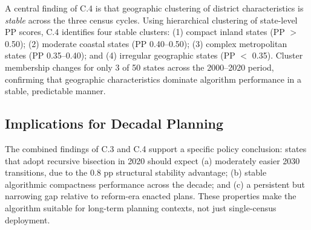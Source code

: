 A central finding of C.4 is that geographic clustering of district
characteristics is \emph{stable} across the three census cycles. Using
hierarchical clustering of state-level PP scores, C.4 identifies four
stable clusters: (1) compact inland states (PP $>$ 0.50); (2) moderate
coastal states (PP 0.40--0.50); (3) complex metropolitan states
(PP 0.35--0.40); and (4) irregular geographic states (PP $<$ 0.35).
Cluster membership changes for only 3 of 50 states across the
2000--2020 period, confirming that geographic characteristics dominate
algorithm performance in a stable, predictable manner.

\subsection{Implications for Decadal Planning}

The combined findings of C.3 and C.4 support a specific policy
conclusion: states that adopt recursive bisection in 2020 should expect
(a) moderately easier 2030 transitions, due to the $0.8$ pp structural
stability advantage; (b) stable algorithmic compactness performance
across the decade; and (c) a persistent but narrowing gap relative to
reform-era enacted plans. These properties make the algorithm suitable
for long-term planning contexts, not just single-census deployment.

